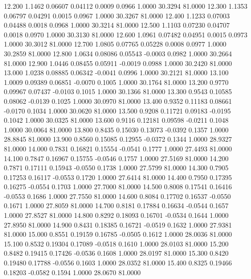   12.200   1.1462   0.06607   0.04112   0.0009   0.0966   1.0000  30.3294  81.0000
  12.300   1.1353   0.06797   0.04291   0.0015   0.0967   1.0000  30.3267  81.0000
  12.400   1.1233   0.07003   0.04488   0.0018   0.0968   1.0000  30.3214  81.0000
  12.500   1.1103   0.07230   0.04707   0.0018   0.0970   1.0000  30.3130  81.0000
  12.600   1.0961   0.07482   0.04951   0.0015   0.0973   1.0000  30.3012  81.0000
  12.700   1.0805   0.07765   0.05228   0.0008   0.0977   1.0000  30.2859  81.0000
  12.800   1.0634   0.08086   0.05543  -0.0003   0.0982   1.0000  30.2664  81.0000
  12.900   1.0446   0.08455   0.05911  -0.0019   0.0988   1.0000  30.2420  81.0000
  13.000   1.0238   0.08885   0.06342  -0.0041   0.0996   1.0000  30.2121  81.0000
  13.100   1.0009   0.09389   0.06851  -0.0070   0.1005   1.0000  30.1764  81.0000
  13.200   0.9770   0.09967   0.07437  -0.0103   0.1015   1.0000  30.1366  81.0000
  13.300   0.9543   0.10585   0.08062  -0.0139   0.1025   1.0000  30.0970  81.0000
  13.400   0.9352   0.11183   0.08661  -0.0170   0.1034   1.0000  30.0620  81.0000
  13.500   0.9208   0.11721   0.09183  -0.0195   0.1042   1.0000  30.0325  81.0000
  13.600   0.9116   0.12181   0.09598  -0.0211   0.1048   1.0000  30.0064  81.0000
  13.800   0.8435   0.15030   0.13073  -0.0392   0.1357   1.0000  28.8845  81.0000
  13.900   0.8560   0.15085   0.12955  -0.0372   0.1344   1.0000  28.9327  81.0000
  14.000   0.7831   0.16821   0.15554  -0.0541   0.1777   1.0000  27.4493  81.0000
  14.100   0.7847   0.16967   0.15755  -0.0546   0.1757   1.0000  27.5169  81.0000
  14.200   0.7871   0.17111   0.15943  -0.0550   0.1738   1.0000  27.5799  81.0000
  14.300   0.7905   0.17253   0.16117  -0.0553   0.1720   1.0000  27.6414  81.0000
  14.400   0.7950   0.17395   0.16275  -0.0554   0.1703   1.0000  27.7000  81.0000
  14.500   0.8008   0.17541   0.16416  -0.0553   0.1686   1.0000  27.7550  81.0000
  14.600   0.8084   0.17702   0.16537  -0.0550   0.1671   1.0000  27.8059  81.0000
  14.700   0.8181   0.17884   0.16634  -0.0544   0.1657   1.0000  27.8527  81.0000
  14.800   0.8292   0.18093   0.16701  -0.0534   0.1644   1.0000  27.8950  81.0000
  14.900   0.8431   0.18385   0.16721  -0.0519   0.1632   1.0000  27.9381  81.0000
  15.000   0.8551   0.19159   0.16785  -0.0505   0.1612   1.0000  28.0036  81.0000
  15.100   0.8532   0.19304   0.17089  -0.0518   0.1610   1.0000  28.0103  81.0000
  15.200   0.8482   0.19415   0.17426  -0.0536   0.1608   1.0000  28.0197  81.0000
  15.300   0.8420   0.19480   0.17788  -0.0556   0.1603   1.0000  28.0352  81.0000
  15.400   0.8325   0.19466   0.18203  -0.0582   0.1594   1.0000  28.0670  81.0000

